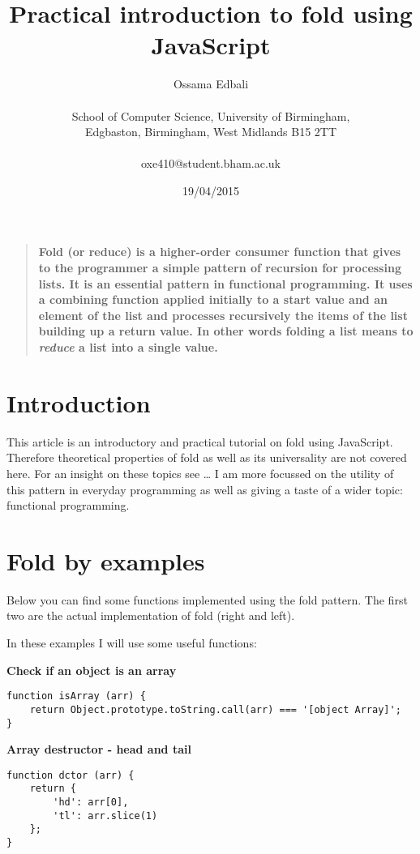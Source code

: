 \documentclass[12pt]{article}
\title{Practical introduction to fold using JavaScript}
\author
{Ossama Edbali\\
\\
\normalsize{School of Computer Science, University of Birmingham,}\\
\normalsize{Edgbaston, Birmingham, West Midlands B15 2TT}\\
\\
\normalsize{oxe410@student.bham.ac.uk}
}
\date{19/04/2015}
\newenvironment{mabstract}{%
\begin{quote} \bf}
{\end{quote}}
\begin{document}
 


\baselineskip24pt

\maketitle 


\begin{mabstract}
	Fold (or reduce) is a higher-order consumer function that gives to the programmer
	a simple pattern of recursion for processing lists. It is an essential pattern
	in functional programming. It uses a combining function applied initially to a start
	value and an element of the list and processes recursively the items of the list
	building up a return value.
	In other words folding a list means to \textit{reduce} a list into a single value.
\end{mabstract}

\section*{Introduction}
This article is an introductory and practical tutorial on fold using JavaScript. Therefore theoretical
properties of fold as well as its universality are not covered here. For an insight on these topics
see \ldots
I am more focussed on the utility of this pattern in everyday programming as well as giving a taste
of a wider topic: functional programming.

\section*{Fold by examples}
Below you can find some functions implemented using the fold pattern. The first two are the actual
implementation of fold (right and left).

In these examples I will use some useful functions:

\textbf{Check if an object is an array}
\medskip
\begin{lstlisting}
function isArray (arr) {
	return Object.prototype.toString.call(arr) === '[object Array]';
}
\end{lstlisting}

\textbf{Array destructor - head and tail}
\medskip
\begin{lstlisting}
function dctor (arr) {
	return {
    	'hd': arr[0],
    	'tl': arr.slice(1)
    };
}
\end{lstlisting}
\end{document}
